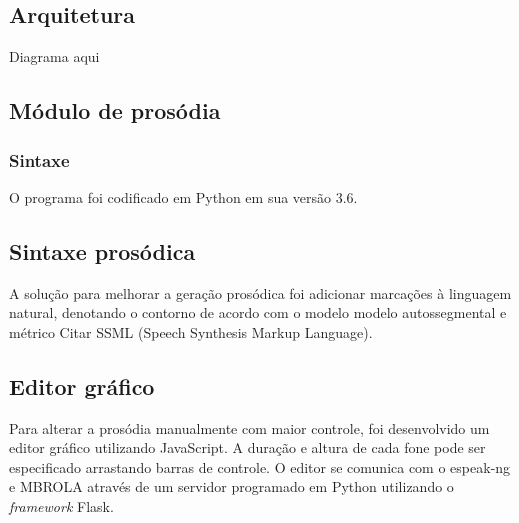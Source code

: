 \subsection{Arquitetura}
Diagrama aqui

\subsection{Módulo de prosódia}
\subsubsection{Sintaxe}
O programa foi codificado em Python em sua versão 3.6.

\subsection{Sintaxe prosódica}
A solução para melhorar a geração prosódica foi adicionar marcações à linguagem
natural, denotando o contorno de acordo com o modelo modelo autossegmental e métrico
Citar SSML (Speech Synthesis Markup Language).

\subsection{Editor gráfico}
Para alterar a prosódia manualmente com maior controle, foi desenvolvido um
editor gráfico utilizando JavaScript. A duração e altura de cada fone pode ser
especificado arrastando barras de controle. O editor se comunica com o espeak-ng
e MBROLA através de um servidor programado em Python utilizando o
\emph{framework} Flask.

